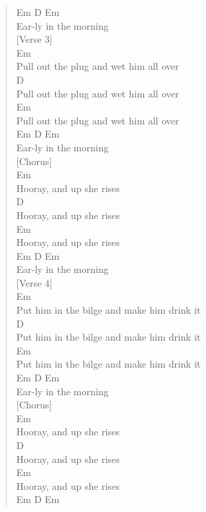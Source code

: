 \documentclass[11pt]{article}
\begin{document}
\begin{verse}
Em  D         Em\\
Ear-ly in the morning\\
\vspace*{1em}
\vspace*{1em}
[Verse 3]\\
Em\\
Pull out the plug and wet him all over\\
D\\
Pull out the plug and wet him all over\\
Em\\
Pull out the plug and wet him all over\\
Em  D         Em\\
Ear-ly in the morning\\
\vspace*{1em}
\vspace*{1em}
[Chorus]\\
Em\\
Hooray, and up she rises\\
D\\
Hooray, and up she rises\\
Em\\
Hooray, and up she rises\\
Em  D         Em\\
Ear-ly in the morning\\
\vspace*{1em}
\vspace*{1em}
[Verse 4]\\
Em\\
Put him in the bilge and make him drink it\\
D\\
Put him in the bilge and make him drink it\\
Em\\
Put him in the bilge and make him drink it\\
Em  D         Em\\
Ear-ly in the morning\\
\vspace*{1em}
\vspace*{1em}
[Chorus]\\
Em\\
Hooray, and up she rises\\
D\\
Hooray, and up she rises\\
Em\\
Hooray, and up she rises\\
Em  D         Em\\

\end{verse}
\end{document}
